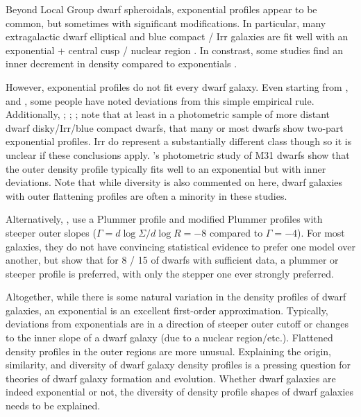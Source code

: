 Beyond Local Group dwarf spheroidals, exponential profiles appear to be
common, but sometimes with significant modifications. In particular,
many extragalactic dwarf elliptical and blue compact / Irr galaxies are
fit well with an exponential + central cusp / nuclear region
\citep[\citet{noeske+2003}]{caldwell+bothun1987}. In constrast, some
studies find an inner decrement in density compared to exponentials
\citep[e.g.,][]{caldwell+1992, makarov+2012}.

However, exponential profiles do not fit every dwarf galaxy. Even
starting from \citet{aparicio+1997}, and \citet[for coma cluster
dE]{graham+guzman2003}, some people have noted deviations from this
simple empirical rule. Additionally, \citet{hunter+elmegreen2006};
\citet{herrmann+hunter+elmegreen2013};
\citet{herrmann+hunter+elmegreen2016}; \citet{lee+2018} note that at
least in a photometric sample of more distant dwarf disky/Irr/blue
compact dwarfs, that many or most dwarfs show two-part exponential
profiles. Irr do represent a substantially different class though so it
is unclear if these conclusions apply. \citet{caldwell+1992}'s
photometric study of M31 dwarfs show that the outer density profile
typically fits well to an exponential but with inner deviations. Note
that while diversity is also commented on here, dwarf galaxies with
outer flattening profiles are often a minority in these studies.

Alternatively, \citet{moskowitz+walker2020}, use a Plummer profile and
modified Plummer profiles with steeper outer slopes
(\(\Gamma = d\log \Sigma / d \log R = -8\) compared to \(\Gamma = -4\)).
For most galaxies, they do not have convincing statistical evidence to
prefer one model over another, but show that for 8 / 15 of dwarfs with
sufficient data, a plummer or steeper profile is preferred, with only
the stepper one ever strongly preferred.

Altogether, while there is some natural variation in the density
profiles of dwarf galaxies, an exponential is an excellent first-order
approximation. Typically, deviations from exponentials are in a
direction of steeper outer cutoff or changes to the inner slope of a
dwarf galaxy (due to a nuclear region/etc.). Flattened density profiles
in the outer regions are more unusual. Explaining the origin,
similarity, and diversity of dwarf galaxy density profiles is a pressing
question for theories of dwarf galaxy formation and evolution. Whether
dwarf galaxies are indeed exponential or not, the diversity of density
profile shapes of dwarf galaxies needs to be explained.

